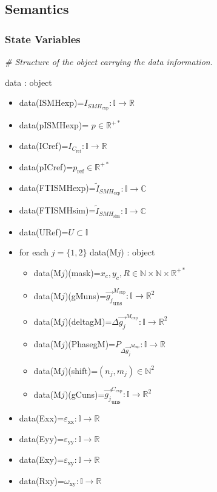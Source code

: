 \documentclass[12pt, titlepage]{article}
\begin{document}

\subsection{Semantics}

\subsubsection{State Variables}

\noindent\textit{{\#} Structure of the object carrying the data 
information.}\medskip

data : object
\begin{itemize}
\item 
data(ISMHexp)=$I_{\mathit{SMH}_{\text{exp}}}:\mathbb{I}\rightarrow\mathbb{R}$
\item data(pISMHexp)= $p \in \mathbb{R}^{+*}$
\item data(ICref)=$I_{\mathit{C}_{\text{ref}}}:\mathbb{I}\rightarrow\mathbb{R}$
\item data(pICref)=$p_{\text{ref}} \in \mathbb{R}^{+*}$
\item 
data(FTISMHexp)=$\widetilde{I}_{\mathit{SMH}_{\text{exp}}}:\mathbb{I}\rightarrow\mathbb{C}$
\item 
data(FTISMHsim)=$\widetilde{I}_{\mathit{SMH}_{\text{sim}}}:\mathbb{I}\rightarrow\mathbb{C}$
\item data(URef)=$U \subset \mathbb{I}$
\item for each $j=\{1,2\}$ data(M$j$) : object 
	\begin{itemize}
	\item data(M$j$)(mask)=$x_c,y_c,R \in 
\mathbb{N}\times\mathbb{N}\times\mathbb{R}^{+*}$
	\item 
data(M$j$)(gMuns)=$\overrightarrow{g_{j}}_{\text{uns}}^{M_{\text{exp}}}:\mathbb{I}\rightarrow\mathbb{R}^2$
	\item data(M$j$)(deltagM)=$\Delta 
\overrightarrow{g_{j}}^{M_{\text{exp}}}:\mathbb{I}\rightarrow\mathbb{R}^2$
	\item data(M$j$)(PhasegM)=$P_{\Delta 
\overrightarrow{g_{j}}^{M_{\text{exp}}}}:\mathbb{I}\rightarrow\mathbb{R}$
	\item data(M$j$)(shift)=$(n_j,m_j)\in\mathbb{N}^2$
	\item 
data(M$j$)(gCuns)=$\overrightarrow{g_{j}}_{\text{uns}}^{C_{\text{exp}}}:\mathbb{I}\rightarrow\mathbb{R}^2$
	\end{itemize}
\item data(Exx)=$\varepsilon_{\text{xx}}:\mathbb{I}\rightarrow\mathbb{R}$
\item data(Eyy)=$\varepsilon_{\text{yy}}:\mathbb{I}\rightarrow\mathbb{R}$
\item data(Exy)=$\varepsilon_{\text{xy}}:\mathbb{I}\rightarrow\mathbb{R}$
\item data(Rxy)=$\omega_{\text{xy}}:\mathbb{I}\rightarrow\mathbb{R}$
\end{itemize}
\end{document}
